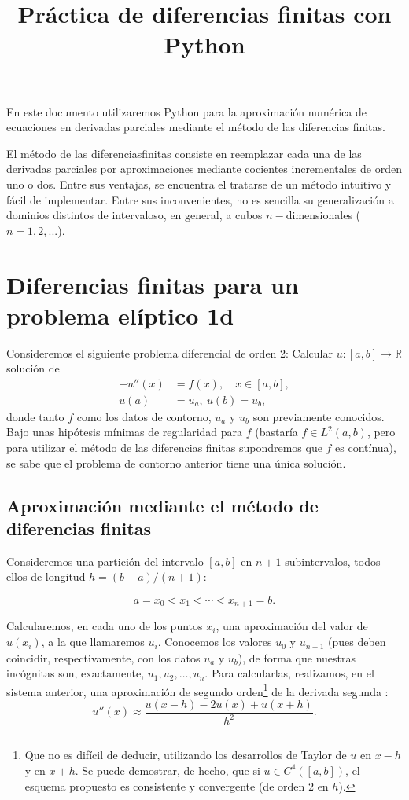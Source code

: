 \documentclass[11pt,spanish,a4wide]{article}
\title{Práctica de diferencias finitas con Python}
\def\Rset{\mathbb{R}}
\begin{document}
  En este documento utilizaremos Python para  la
  aproximación numérica de ecuaciones en derivadas parciales mediante
  el método de las diferencias finitas.

El método de las diferenciasfinitas consiste en reemplazar cada una de
las derivadas parciales por aproximaciones mediante cocientes
incrementales de orden uno o dos. Entre sus ventajas, se encuentra el
tratarse de un método intuitivo y fácil de implementar. Entre sus
inconvenientes, no es sencilla su generalización a dominios distintos
de intervaloso, en general, a cubos $n-$dimensionales ($n=1,2,...$).

\section{Diferencias finitas para un problema elíptico 1d}

\label{sec:MEF-difusion-1d}

Consideremos el siguiente problema diferencial de orden 2:
Calcular $u:[a,b] \to  \Rset$ solución de
\begin{align}
  \label{pb-eliptico-1d-a}
  -u''(x) &= f(x), \quad x\in [a,b], \\
  \label{pb-eliptico-1d-b}
  u(a)&=u_a, \ u(b)=u_b,
\end{align}
donde tanto $f$ como los datos de contorno, $u_a$ y $u_b$ son
previamente conocidos. Bajo unas hipótesis mínimas de regularidad para
$f$ (bastaría $f\in L^2(a,b)$, pero para utilizar el método de las
diferencias finitas supondremos que $f$ es contínua), se sabe que el
problema de contorno anterior tiene una única solución.

\subsection{Aproximación mediante el método de diferencias finitas}
Consideremos una partición del intervalo $[a,b]$ en $n+1$
subintervalos, todos ellos de longitud $h=(b-a)/(n+1)$:

$$
a=x_0 < x_1 < \cdots < x_{n+1} = b.
$$

Calcularemos, en cada uno de los puntos $x_i$, una aproximación del
valor de $u(x_i)$, a la que llamaremos $u_i$. Conocemos los valores $u_0$ y
$u_{n+1}$ (pues deben coincidir, respectivamente, con los datos $u_a$
y $u_b$), de forma que nuestras incógnitas son, exactamente, $u_1,
u_2,\dots,u_n$. Para calcularlas, realizamos, en el sistema anterior,
una aproximación de segundo orden\footnote{Que no es difícil de
  deducir, utilizando los desarrollos de Taylor de $u$ en
$x-h$ y en $x+h$. Se puede demostrar, de hecho, que si $u \in
C^4([a,b])$, el esquema propuesto es  consistente
y convergente (de orden $2$ en $h$).} de la derivada segunda
:
$$
u''(x) \approx \frac{u(x-h)-2u(x)+u(x+h)}{h^2}.
$$
\end{document}
